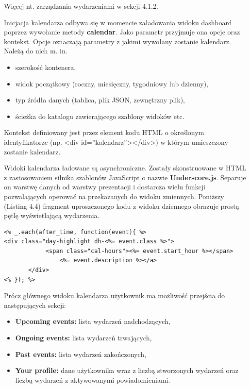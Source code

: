 Więcej nt. zarządzania wydarzeniami w sekcji 4.1.2.

Inicjacja kalendarza odbywa się w momencie załadowania widoku dashboard poprzez wywołanie metody \textbf{calendar}. Jako parametr przyjmuje ona opcje oraz kontekst. Opcje oznaczają parametry z jakimi wywołany zostanie kalendarz. Należą do nich m. in.

\begin{itemize}
\item szerokość kontenera,
\item widok początkowy (roczny, miesięczny, tygodniowy lub dzienny),
\item typ źródła danych (tablica, plik JSON, zewnętrzny plik),
\item ścieżka do katalogu zawierającego szablony widoków etc.
\end{itemize}

Kontekst definiowany jest przez element kodu HTML o określonym identyfikatorze (np. <div id=''kalendarz''></div>) w którym umieszczony zostanie kalendarz.

Widoki kalendarza ładowane są asynchroniczne. Zostały skonstruowane w HTML z zastosowaniem silnika szablonów JavaScript o nazwie \textbf{Underscore.js}\cite{underscore}. Separuje on warstwę danych od warstwy prezentacji i dostarcza wielu funkcji pozwalających operować na przekazanych do widoku zmiennych. Poniższy (Listing 4.4) fragment uproszczonego kodu z widoku dziennego obrazuje prostą pętlę wyświetlającą wydarzenia.

\begin{lstlisting}[style=html5, caption=Fragment kodu prezentujący składnię Underscore.js., label=amb, captionpos=b]
<% _.each(after_time, function(event){ %>
<div class="day-highlight dh-<%= event.class %>">
       		<span class="cal-hours"><%= event.start_hour %></span>
              	<%= event.description %></a>
       </div>
<% }); %>
\end{lstlisting}

Prócz głównego widoku kalendarza użytkownik ma możliwość przejścia do następujących sekcji:

\begin{itemize}
\item \textbf{Upcoming events:} lista wydarzeń nadchodzących,
\item \textbf{Ongoing events:} lista wydarzeń trwających,
\item \textbf{Past events:} lista wydarzeń zakończonych,
\item \textbf{Your profile:} dane użytkownika wraz z liczbą stworzonych wydarzeń oraz liczbą wydarzeń z aktywowanymi powiadomieniami.
\end{itemize}

